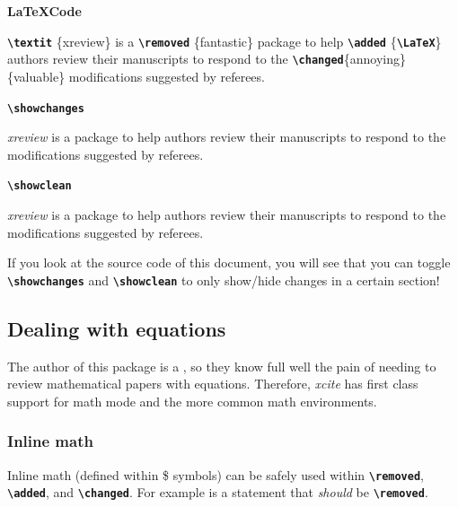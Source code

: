 \documentclass[a4paper]{ltxdoc}
\newcommand{\writecommand}[1]{\texttt{\textbf{{\textbackslash#1}}}}
\newcommand{\writearg}[1]{\{#1\}}
\begin{document}
\begin{center}
\begin{minipage}[t]{0.3\linewidth}
\textbf{\LaTeX Code}

\writecommand{textit} \writearg{xreview} is a \writecommand{removed} \writearg{fantastic} package to help \writecommand{added} \writearg{\writecommand{LaTeX}} authors review their manuscripts to respond to the \writecommand{changed}\writearg{annoying} \writearg{valuable} modifications suggested by referees.
 
\end{minipage}
\hfill
\begin{minipage}[t]{0.3\linewidth}
\writecommand{showchanges}
\showchanges

\textit{xreview} is a \remspace package to help \added{\LaTeX} authors review their manuscripts to respond to the  modifications suggested by referees.

\end{minipage}
\hfill
\begin{minipage}[t]{0.3\linewidth}   
\writecommand{showclean}
\showclean

\textit{xreview} is a \remspace package to help \added{\LaTeX} authors review their manuscripts to respond to the  modifications suggested by referees.
\end{minipage}
\end{center}
\showchanges

If you look at the source code of this document, you will see that you can toggle \writecommand{showchanges} and \writecommand{showclean} to only show/hide changes in a certain section!

\subsection{Dealing with equations}

The author of this package is a , so they know full well the pain of needing to review mathematical papers with equations. 
Therefore, \textit{xcite} has first class support for math mode and the more common math environments. 

\subsubsection{Inline math}

Inline math (defined within \$ symbols) can be safely used within \writecommand{removed}, \writecommand{added}, and \writecommand{changed}. For example  is a statement that \textit{should} be \writecommand{removed}.
\end{document}
